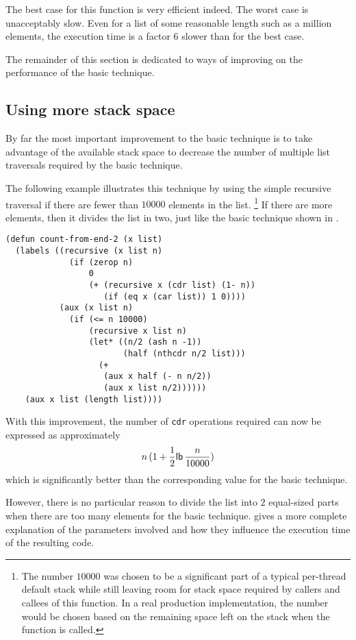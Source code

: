 The best case for this function is very efficient indeed.
The worst case is unacceptably slow.  Even for a list of some
reasonable length such as a million elements, the execution time is a
factor $6$ slower than for the best case.

The remainder of this section is dedicated to ways of improving on the
performance of the basic technique.

\subsection{Using more stack space}
\label{sec-more-stack}

By far the most important improvement to the basic technique is to
take advantage of the available stack space to decrease the number of
multiple list traversals required by the basic technique.

The following example illustrates this technique by using the simple
recursive traversal if there are fewer than $10000$ elements in the
list.%
\footnote{The number $10000$ was chosen to be a significant part of a
  typical per-thread default stack while still leaving room for stack
  space required by callers and callees of this function.  In a real
  production implementation, the number would be chosen based on the
  remaining space left on the stack when the function is called.}
If there are more elements, then it divides the list in two,
just like the basic technique shown in .

{\small
\begin{verbatim}
(defun count-from-end-2 (x list)
  (labels ((recursive (x list n)
             (if (zerop n)
                 0
                 (+ (recursive x (cdr list) (1- n))
                    (if (eq x (car list)) 1 0))))
           (aux (x list n)
             (if (<= n 10000)
                 (recursive x list n)
                 (let* ((n/2 (ash n -1))
                        (half (nthcdr n/2 list)))
                   (+
                    (aux x half (- n n/2))
                    (aux x list n/2))))))
    (aux x list (length list))))
\end{verbatim}
}

With this improvement, the number of \texttt{cdr} operations required
can now be expressed as ap\-proximately 
\[
n\thinspace (1 +
\frac{1}{2}\mathsf{lb}\thinspace \frac{n}{10000})
\]
which is significantly better than the corresponding value for the
basic technique.

However, there is no particular reason to divide the list into $2$
equal-sized parts when there are too many elements for the basic
technique.  gives a more complete explanation
of the parameters involved and how they influence the execution time
of the resulting code.

